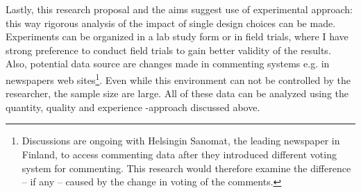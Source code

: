 \documentclass{article}
\begin{document}
Lastly, this research proposal and the aims suggest use of experimental approach: this way rigorous analysis of the impact of single design choices can be made. Experiments can be organized in a lab study form or in field trials, where I have strong preference to conduct field trials to gain better validity of the results. Also, potential data source are changes made in commenting systems e.g. in newspapers web sites\footnote{Discussions are ongoing with Helsingin Sanomat, the leading newspaper in Finland, to access commenting data after they introduced different voting system for commenting. This research would therefore examine the difference -- if any -- caused by the change in voting of the comments.}. Even while this environment can not be controlled by the researcher, the sample size are large. All of these data can be analyzed using the quantity, quality and experience -approach discussed above.

\newpage


\begin{small}

\end{small}
\end{document}
